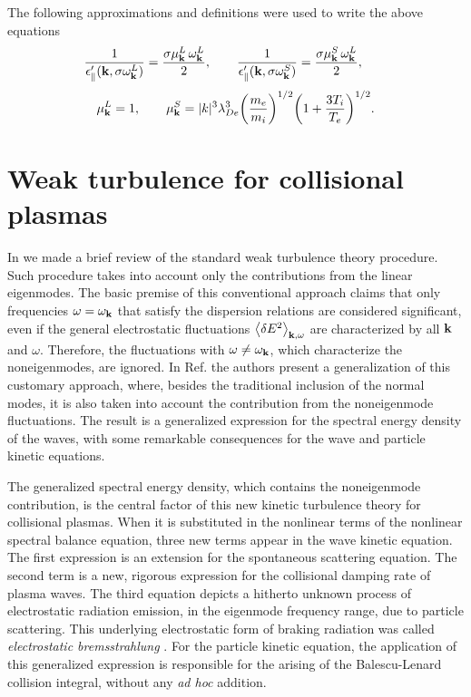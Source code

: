 \documentclass[12pt,a4paper,ruledheader]{report}
\begin{document}
The following approximations and definitions were used to write
the above equations
\begin{displaymath}
\frac{1}{\epsilon '_\parallel({\bf k},\sigma\omega_{\bf k}^L)}
=\frac{\sigma\mu_{\bf k}^L\,\omega_{\bf k}^L}{2},\qquad
\frac{1}{\epsilon '_\parallel({\bf k},\sigma\omega_{\bf k}^S)}
=\frac{\sigma\mu_{\bf k}^S\,\omega_{\bf k}^L}{2},\qquad
\end{displaymath}
\begin{displaymath}
\mu_{\bf k}^L=1,\qquad
\mu_{\bf k}^S=|k|^3\lambda_{De}^3\biggl(\frac{m_e}{m_i}\biggr)^{1/2}
\biggl(1+\frac{3T_i}{T_e}\biggr)^{1/2}.
\end{displaymath}
\chapter{Weak turbulence for collisional plasmas}
\label{noneigenmode}
In  we made a brief review of the standard weak
turbulence theory procedure. Such procedure takes into account only
the contributions from the linear eigenmodes. The basic premise of this
conventional approach claims that only frequencies $\omega=\omega_{\bf k}$
that satisfy the dispersion relations are considered significant, even if
the general electrostatic fluctuations $\left<\delta E^2\right>_{{\bf k},\omega}$
are characterized by all ${\bf k}$ and $\omega$. Therefore, the fluctuations
with 
$\omega \ne \omega_{\bf k}$, which characterize the noneigenmodes,
are ignored. In Ref. \cite{YZKS16} the authors present a generalization
of this customary approach, where, besides the traditional inclusion of
the normal modes, it is also taken into account the contribution from the
noneigenmode fluctuations. The result is a generalized expression for the
spectral energy density of the waves, with some remarkable consequences
for the wave and particle kinetic equations.

The generalized spectral energy density, which contains the noneigenmode
contribution, is the central factor of this new kinetic turbulence theory
for collisional plasmas. When it is substituted in the nonlinear terms of
the nonlinear spectral balance equation, three new terms appear in the wave
kinetic equation. The first expression is an extension for the spontaneous
scattering equation. The second term is a new, rigorous expression for the
collisional damping rate of plasma waves. The third equation depicts a
hitherto unknown process of electrostatic radiation emission, in the eigenmode
frequency range, due to particle scattering. This underlying electrostatic
form of braking radiation was
called \emph{electrostatic bremsstrahlung}
\cite{YZKS16}. For the particle kinetic equation, the application of this
generalized expression is responsible for the arising of the Balescu-Lenard
collision integral, without any \emph{ad hoc} addition.
\end{document}
